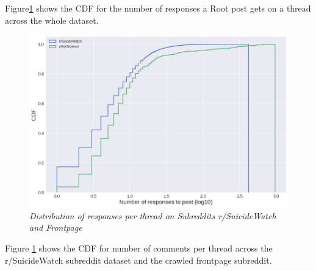 Figure\ref{fig:responseDist} shows the CDF for the number of responses a Root post gets on a thread across the whole dataset. 
\begin{figure}[!h]
    \centering
    \includegraphics[width=0.4\linewidth]{responseDistSW}
    \caption{\textsl{ Distribution of responses per thread on Subreddits r/SuicideWatch and Frontpage }}
    \label{fig:responseDist}
\end{figure}
Figure \ref{fig:responseDist} shows the CDF for number of comments per thread across the r/SuicideWatch subreddit dataset and the crawled frontpage subreddit. 
